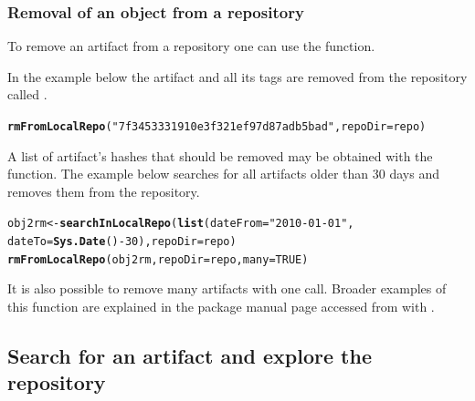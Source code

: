 \documentclass[nojss]{jss}\usepackage[]{graphicx}\usepackage[]{color}
\makeatletter
\newcommand{\hlnum}[1]{\textcolor[rgb]{0.686,0.059,0.569}{#1}}%
\newcommand{\hlstr}[1]{\textcolor[rgb]{0.192,0.494,0.8}{#1}}%
\newcommand{\hlopt}[1]{\textcolor[rgb]{0,0,0}{#1}}%
\newcommand{\hlstd}[1]{\textcolor[rgb]{0.345,0.345,0.345}{#1}}%
\newcommand{\hlkwb}[1]{\textcolor[rgb]{0.69,0.353,0.396}{#1}}%
\newcommand{\hlkwc}[1]{\textcolor[rgb]{0.333,0.667,0.333}{#1}}%
\newcommand{\hlkwd}[1]{\textcolor[rgb]{0.737,0.353,0.396}{\textbf{#1}}}%
\newenvironment{kframe}{%
 \def\at@end@of@kframe{}%
 \ifinner\ifhmode%
  \def\at@end@of@kframe{\end{minipage}}%
  \begin{minipage}{\columnwidth}%
 \fi\fi%
 \def\FrameCommand##1{\hskip\@totalleftmargin \hskip-\fboxsep
 \colorbox{shadecolor}{##1}\hskip-\fboxsep
     \hskip-\linewidth \hskip-\@totalleftmargin \hskip\columnwidth}%
 \MakeFramed {\advance\hsize-\width
   \@totalleftmargin\z@ \linewidth\hsize
   \@setminipage}}%
 {\par\unskip\endMakeFramed%
 \at@end@of@kframe}
\newenvironment{knitrout}{}{} %
\makeatother
\begin{document}
\subsubsection{Removal of an object from a repository}

To remove an artifact from a repository one can use the  function.

In the example below the artifact  and all its tags are removed from the repository called .

\begin{knitrout}
\color{fgcolor}\begin{kframe}
\begin{alltt}
\hlkwd{rmFromLocalRepo}\hlstd{(}\hlstr{"7f3453331910e3f321ef97d87adb5bad"}\hlstd{,} \hlkwc{repoDir} \hlstd{= repo)}
\end{alltt}
\end{kframe}
\end{knitrout}


A list of artifact's hashes that should be removed may be obtained with the  function. The example below searches for all artifacts older than 30 days and removes them from the  repository.

\begin{knitrout}
\color{fgcolor}\begin{kframe}
\begin{alltt}
\hlstd{obj2rm} \hlkwb{<-} \hlkwd{searchInLocalRepo}\hlstd{(}\hlkwd{list}\hlstd{(}\hlkwc{dateFrom} \hlstd{=} \hlstr{"2010-01-01"}\hlstd{,}
    \hlkwc{dateTo} \hlstd{=} \hlkwd{Sys.Date}\hlstd{()}\hlopt{-}\hlnum{30}\hlstd{),} \hlkwc{repoDir} \hlstd{= repo)}
\hlkwd{rmFromLocalRepo}\hlstd{(obj2rm,} \hlkwc{repoDir} \hlstd{= repo,} \hlkwc{many} \hlstd{=} \hlnum{TRUE}\hlstd{)}
\end{alltt}
\end{kframe}
\end{knitrout}


It is also possible to remove many artifacts with one call. Broader examples of this function are explained in the package manual page accessed from  with .

\subsection{Search for an artifact and explore the repository}
\label{sec:search33}
\end{document}
